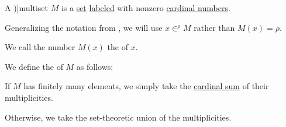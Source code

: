 \begin{definition}\label{def:multiset}
  A \term[ru=мультимножество (\incite[28]{Новиков2013})]{multiset} \( M \) is a \hyperref[def:set]{set} \hyperref[def:labeled_set]{labeled} with nonzero \hyperref[def:cardinal]{cardinal numbers}.

  Generalizing the notation from , we will use \( x \in^\rho M \) rather than \( M(x) = \rho \).

  \begin{thmenum}
     We call the number \( M(x) \) the  of \( x \).

    \mimprovised We define the  of \( M \) as follows:
    \begin{thmenum}
       If \( M \) has finitely many elements, we simply take the \hyperref[def:cardinal_arithmetic/addition]{cardinal sum} of their multiplicities.

       Otherwise, we take the set-theoretic union of the multiplicities.
    \end{thmenum}
  \end{thmenum}
\end{definition}

